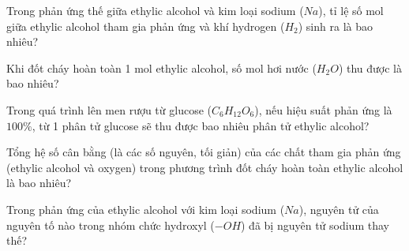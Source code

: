 \begin{ex}%
	Trong phản ứng thế giữa ethylic alcohol và kim loại sodium ($Na$), tỉ lệ số mol giữa ethylic alcohol tham gia phản ứng và khí hydrogen ($H_2$) sinh ra là bao nhiêu?
\end{ex}

\begin{ex}%
	Khi đốt cháy hoàn toàn 1 mol ethylic alcohol, số mol hơi nước ($H_2O$) thu được là bao nhiêu?
\end{ex}

\begin{ex}%
	Trong quá trình lên men rượu từ glucose ($C_6H_{12}O_6$), nếu hiệu suất phản ứng là $100\%$, từ 1 phân tử glucose sẽ thu được bao nhiêu phân tử ethylic alcohol?
\end{ex}

\begin{ex}%
	Tổng hệ số cân bằng (là các số nguyên, tối giản) của các chất tham gia phản ứng (ethylic alcohol và oxygen) trong phương trình đốt cháy hoàn toàn ethylic alcohol là bao nhiêu?
\end{ex}

\begin{ex}%
	Trong phản ứng của ethylic alcohol với kim loại sodium ($Na$), nguyên tử của nguyên tố nào trong nhóm chức hydroxyl ($-OH$) đã bị nguyên tử sodium thay thế?
\end{ex}